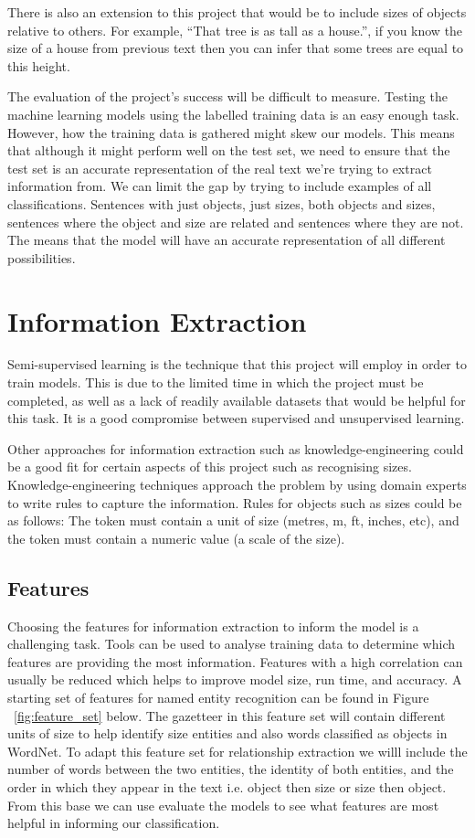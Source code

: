 \documentclass[11pt,oneside]{book}
\begin{document}
There is also an extension to this project that would be to include sizes of objects relative to others. For example, “That tree is as tall as a house.”, if you know the size of a house from previous text then you can infer that some trees are equal to this height.

The evaluation of the project’s success will be difficult to measure. Testing the machine learning models using the labelled training data is an easy enough task. However, how the training data is gathered might skew our models. This means that although it might perform well on the test set, we need to ensure that the test set is an accurate representation of the real text we’re trying to extract information from. We can limit the gap by trying to include examples of all classifications. Sentences with just objects, just sizes, both objects and sizes, sentences where the object and size are related and sentences where they are not. The means that the model will have an accurate representation of all different possibilities.

\section{Information Extraction}

Semi-supervised learning is the technique that this project will employ in order to train models. This is due to the limited time in which the project must be completed, as well as a lack of readily available datasets that would be helpful for this task. It is a good compromise between supervised and unsupervised learning.

Other approaches for information extraction such as knowledge-engineering could be a good fit for certain aspects of this project such as recognising sizes. Knowledge-engineering techniques approach the problem by using domain experts to write rules to capture the information. Rules for objects such as sizes could be as follows: The token must contain a unit of size (metres, m, ft, inches, etc), and the token must contain a numeric value (a scale of the size).

\subsection{Features}
Choosing the features for information extraction to inform the model is a challenging task. Tools can be used to analyse training data to determine which features are providing the most information. Features with a high correlation can usually be reduced which helps to improve model size, run time, and accuracy. A starting set of features for named entity recognition can be found in Figure ~\ref{fig:feature_set} below. The gazetteer in this feature set will contain different units of size to help identify size entities and also words classified as objects in WordNet. To adapt this feature set for relationship extraction we willl include the number of words between the two entities, the identity of both entities, and the order in which they appear in the text i.e. object then size or size then object. From this base we can use evaluate the models to see what features are most helpful in informing our classification.
\end{document}
